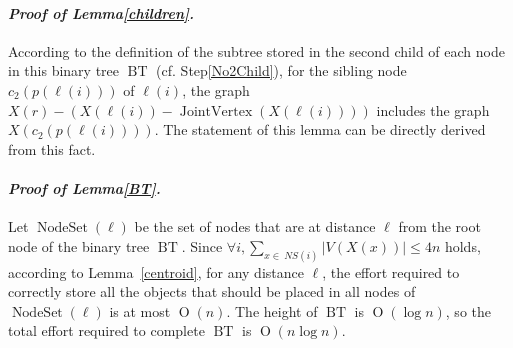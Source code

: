 \documentclass[letter,11pt]{article}
\newcommand{\white}{\qquad{\framebox{\rule{0pt}{4pt}}}}
\newcommand{\owari}{\hfill\white}
\theoremstyle{definition}
\theoremstyle{definition}
\DeclareMathOperator{\Od}{O}
\DeclareMathOperator{\BT}{BT}
\DeclareMathOperator{\JoiV}{JointVertex}
\DeclareMathOperator{\NS}{NodeSet}
\newcommand{\1}{\boldmath$~1~$\unboldmath}
\newcommand{\qedgo}{\vspace{0.35cm}}
\newcommand{\tume}{\hspace*{0.2em}}
\newenvironment{Proofof}[1]{\expandafter
\paragraph{{\it Proof of #1.}}}{\hspace{5mm}\owari\qedgo}
\begin{document}

\begin{Proofof}{Lemma\tume\ref{children}}
According to the definition of the subtree stored in the second child of each node in this binary tree $\BT$ (cf. Step\tume\ref{No2Child}), for the sibling node  $c_2(p(\ell(i)))$ of $\ell(i)$, the graph $X(r)-(X(\ell(i))-\JoiV(X(\ell(i))))$ includes the graph $X(c_2(p(\ell(i))))$. 
The statement of this lemma can be directly derived from this fact. 
\end{Proofof}


\begin{Proofof}{Lemma\tume\ref{BT}}
Let $\NS(\ell)$ be the set of nodes that are at distance $\ell$ from the root node of the binary tree $\BT$.
Since $\forall i, \sum_{x \in\ NS(i)}|V(X(x))|\leq 4n$ holds, 
according to Lemma~\ref{centroid}, for any distance $\ell$, the effort required to correctly store all the objects that should be placed in all nodes of $\NS(\ell)$ is at most $\Od(n)$. 
The height of $\BT$ is $\Od(\log n)$, so the total effort required to complete $\BT$ is $\Od(n\log n)$. 
\end{Proofof}

\end{document}
